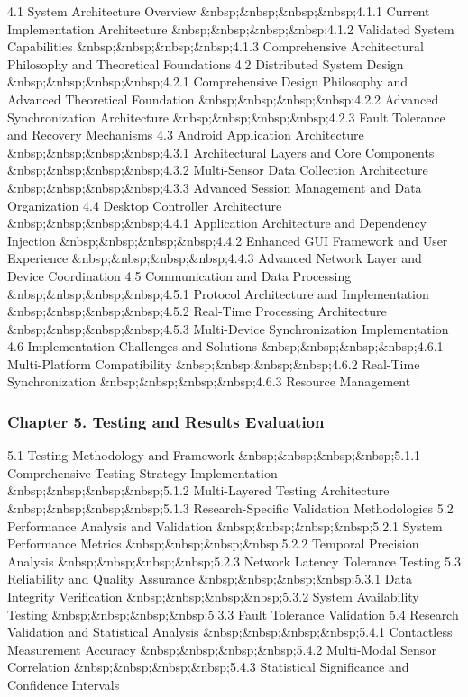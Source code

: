 \documentclass[11pt,a4paper]{report}
\begin{document}
4.1 System Architecture Overview
\&nbsp;\&nbsp;\&nbsp;\&nbsp;4.1.1 Current Implementation Architecture
\&nbsp;\&nbsp;\&nbsp;\&nbsp;4.1.2 Validated System Capabilities
\&nbsp;\&nbsp;\&nbsp;\&nbsp;4.1.3 Comprehensive Architectural Philosophy and Theoretical Foundations
4.2 Distributed System Design
\&nbsp;\&nbsp;\&nbsp;\&nbsp;4.2.1 Comprehensive Design Philosophy and Advanced Theoretical Foundation
\&nbsp;\&nbsp;\&nbsp;\&nbsp;4.2.2 Advanced Synchronization Architecture
\&nbsp;\&nbsp;\&nbsp;\&nbsp;4.2.3 Fault Tolerance and Recovery Mechanisms
4.3 Android Application Architecture
\&nbsp;\&nbsp;\&nbsp;\&nbsp;4.3.1 Architectural Layers and Core Components
\&nbsp;\&nbsp;\&nbsp;\&nbsp;4.3.2 Multi-Sensor Data Collection Architecture
\&nbsp;\&nbsp;\&nbsp;\&nbsp;4.3.3 Advanced Session Management and Data Organization
4.4 Desktop Controller Architecture
\&nbsp;\&nbsp;\&nbsp;\&nbsp;4.4.1 Application Architecture and Dependency Injection
\&nbsp;\&nbsp;\&nbsp;\&nbsp;4.4.2 Enhanced GUI Framework and User Experience
\&nbsp;\&nbsp;\&nbsp;\&nbsp;4.4.3 Advanced Network Layer and Device Coordination
4.5 Communication and Data Processing
\&nbsp;\&nbsp;\&nbsp;\&nbsp;4.5.1 Protocol Architecture and Implementation
\&nbsp;\&nbsp;\&nbsp;\&nbsp;4.5.2 Real-Time Processing Architecture
\&nbsp;\&nbsp;\&nbsp;\&nbsp;4.5.3 Multi-Device Synchronization Implementation
4.6 Implementation Challenges and Solutions
\&nbsp;\&nbsp;\&nbsp;\&nbsp;4.6.1 Multi-Platform Compatibility
\&nbsp;\&nbsp;\&nbsp;\&nbsp;4.6.2 Real-Time Synchronization
\&nbsp;\&nbsp;\&nbsp;\&nbsp;4.6.3 Resource Management

\subsubsection{Chapter 5. Testing and Results Evaluation}

5.1 Testing Methodology and Framework
\&nbsp;\&nbsp;\&nbsp;\&nbsp;5.1.1 Comprehensive Testing Strategy Implementation
\&nbsp;\&nbsp;\&nbsp;\&nbsp;5.1.2 Multi-Layered Testing Architecture
\&nbsp;\&nbsp;\&nbsp;\&nbsp;5.1.3 Research-Specific Validation Methodologies
5.2 Performance Analysis and Validation
\&nbsp;\&nbsp;\&nbsp;\&nbsp;5.2.1 System Performance Metrics
\&nbsp;\&nbsp;\&nbsp;\&nbsp;5.2.2 Temporal Precision Analysis
\&nbsp;\&nbsp;\&nbsp;\&nbsp;5.2.3 Network Latency Tolerance Testing
5.3 Reliability and Quality Assurance
\&nbsp;\&nbsp;\&nbsp;\&nbsp;5.3.1 Data Integrity Verification
\&nbsp;\&nbsp;\&nbsp;\&nbsp;5.3.2 System Availability Testing
\&nbsp;\&nbsp;\&nbsp;\&nbsp;5.3.3 Fault Tolerance Validation
5.4 Research Validation and Statistical Analysis
\&nbsp;\&nbsp;\&nbsp;\&nbsp;5.4.1 Contactless Measurement Accuracy
\&nbsp;\&nbsp;\&nbsp;\&nbsp;5.4.2 Multi-Modal Sensor Correlation
\&nbsp;\&nbsp;\&nbsp;\&nbsp;5.4.3 Statistical Significance and Confidence Intervals
\end{document}
